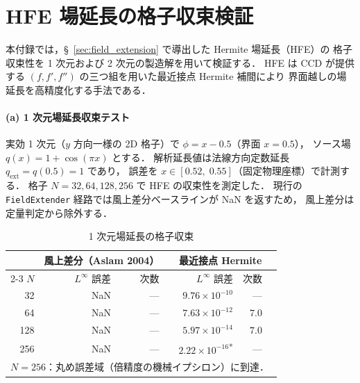 %

\section{HFE 場延長の格子収束検証}
\label{app:hfe_verify}

本付録では，§~\ref{sec:field_extension} で導出した Hermite 場延長（HFE）の
格子収束性を 1 次元および 2 次元の製造解を用いて検証する．
HFE は CCD が提供する $(f, f', f'')$ の三つ組を用いた最近接点 Hermite 補間により
界面越しの場延長を高精度化する手法である．


\paragraph{(a) 1 次元場延長収束テスト}
実効 1 次元（$y$ 方向一様の 2D 格子）で
$\phi = x - 0.5$（界面 $x = 0.5$），
ソース場 $q(x) = 1 + \cos(\pi x)$ とする．
解析延長値は法線方向定数延長 $q_{\mathrm{ext}} = q(0.5) = 1$ であり，
誤差を $x \in [0.52,\; 0.55]$（固定物理座標）で計測する．
格子 $N = 32, 64, 128, 256$ で HFE の収束性を測定した．
現行の \texttt{FieldExtender} 経路では風上差分ベースラインが NaN を返すため，
風上差分は定量判定から除外する．

\begin{table}[htbp]
\centering
\caption{1 次元場延長の格子収束}
\label{tab:field_extension_convergence}
\begin{tabular}{rrrcrrc}
\toprule
 & \multicolumn{2}{c}{風上差分（Aslam 2004）} & & \multicolumn{2}{c}{最近接点 Hermite} & \\
\cline{2-3}\cline{5-6}
$N$ & $L^\infty$ 誤差 & 次数 & & $L^\infty$ 誤差 & 次数 \\
\midrule
 32 & NaN & --- & & $9.76 \times 10^{-10}$            & ---   \\
 64 & NaN & --- & & $7.63 \times 10^{-12}$            & $7.0$ \\
128 & NaN & --- & & $5.97 \times 10^{-14}$            & $7.0$ \\
256 & NaN & --- & & $2.22 \times 10^{-16}$\textsuperscript{*} & ---   \\
\bottomrule
\multicolumn{7}{l}{\footnotesize *$N = 256$：丸め誤差域（倍精度の機械イプシロン）に到達．}
\end{tabular}
\end{table}

